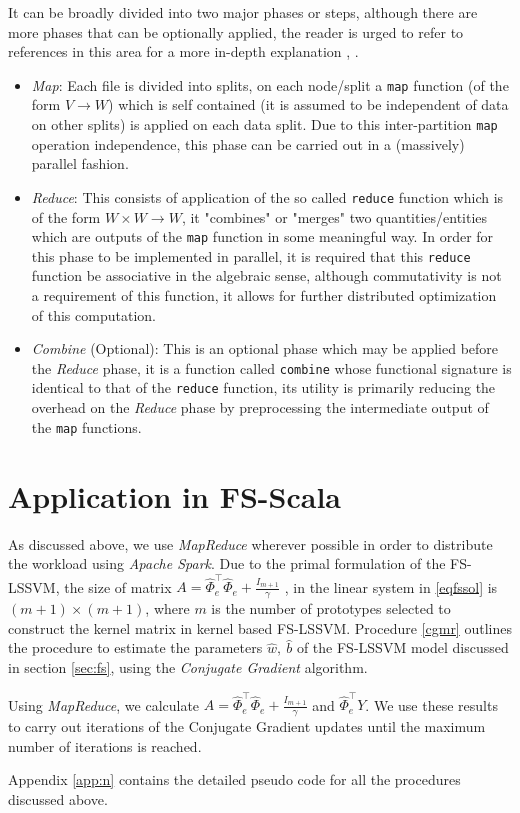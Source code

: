 It can be broadly divided into two major phases or steps, although there are more phases that can be optionally applied, the reader is urged to refer to references in this area for a more in-depth explanation \cite{HDFS}, \cite{HadoopBook} \cite{Yarn}.

\begin{itemize}
\item \textit{Map}: Each file is divided into splits, on each node/split a \texttt{map} function (of the form $V \longrightarrow W$) which is self contained (it is assumed to be independent of data on other splits) is applied on each data split. Due to this inter-partition \texttt{map} operation independence, this phase can be carried out in a (massively) parallel fashion.

\item \textit{Reduce}: This consists of application of the so called \texttt{reduce} function which is of the form $W \times W \longrightarrow W$, it "combines" or "merges" two quantities/entities which are outputs of the \texttt{map} function in some meaningful way. In order for this phase to be implemented in parallel, it is required that this \texttt{reduce} function be associative in the algebraic sense, although commutativity is not a requirement of this function, it allows for further distributed optimization of this computation.

\item \textit{Combine} (Optional): This is an optional phase which may be applied before the \textit{Reduce} phase, it is a function called \texttt{combine} whose functional signature is identical to that of the \texttt{reduce} function, its utility is primarily reducing the overhead on the \textit{Reduce} phase by preprocessing the intermediate output of the \texttt{map} functions. 
\end{itemize}


\section{Application in FS-Scala}

As discussed above, we use \textit{MapReduce} wherever possible in order to distribute the workload using \textit{Apache Spark}. Due to the primal formulation of the FS-LSSVM, the size of matrix $A =  \hat{\Phi}^{\intercal}_e \hat{\Phi}_e + \frac{\mathit{I}_{m+1}}{\gamma}$ , in the linear system in \eqref{eqfssol} is $(m+1) \times (m+1)$, where $m$ is the number of prototypes selected to construct the kernel matrix in kernel based FS-LSSVM. Procedure \ref{cgmr} outlines the procedure to estimate the parameters $\hat{w},\ \hat{b}$ of the FS-LSSVM model discussed in section \ref{sec:fs}, using the \textit{Conjugate Gradient} algorithm. 

Using \textit{MapReduce}, we calculate $A = \hat{\Phi}^{\intercal}_e \hat{\Phi}_e + \frac{\mathit{I}_{m+1}}{\gamma}$ and $\hat{\Phi}^{\intercal}_e Y$. We use these results to carry out iterations of the Conjugate Gradient updates until the maximum number of iterations is reached.

Appendix \ref{app:n} contains the detailed pseudo code for all the procedures discussed above. 